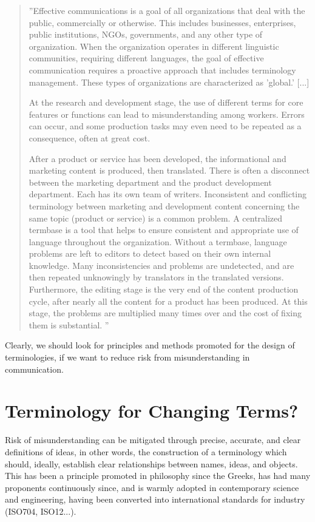 \documentclass[graybox,envcountchap,sectrefs]{svmono}
\begin{document}
\begin{quote}
''Effective communications is a goal of all organizations that deal with the public, commercially or otherwise. This includes businesses, enterprises, public institutions, NGOs, governments, and any other type of organization. When the organization operates in different linguistic communities, requiring different languages, the goal of effective communication requires a proactive approach that includes terminology management. These types of organizations are characterized as 'global.' [...]

At the research and development stage, the use of different terms for core features or functions can lead to misunderstanding among workers. Errors can occur, and some production tasks may even need to be repeated as a consequence, often at great cost. 

After a product or service has been developed, the informational and marketing content is produced, then translated. There is often a disconnect between the marketing department and the product development department. Each has its own team of writers. Inconsistent and conflicting terminology between marketing and development content concerning the same topic (product or service) is a common problem. A centralized termbase is a tool that helps to ensure consistent and appropriate use of language throughout the organization. Without a termbase, language problems are left to editors to detect based on their own internal knowledge. Many inconsistencies and problems are undetected, and are then repeated unknowingly by translators in the translated versions. Furthermore, the editing stage is the very end of the content production cycle, after nearly all the content for a product has been produced. At this stage, the problems are multiplied many times over and the cost of fixing them is substantial.
'' \cite{terminorgs2016}
\end{quote}

Clearly, we should look for principles and methods promoted for the design of terminologies, if we want to reduce risk from misunderstanding in communication.

\section{Terminology for Changing Terms?}

Risk of misunderstanding can be mitigated through precise, accurate, and clear definitions of ideas, in other words, the construction of a terminology which should, ideally, establish clear relationships between names, ideas, and objects. This has been a principle promoted in philosophy since the Greeks, has had many proponents continuously since, and is warmly adopted in contemporary science and engineering, having been converted into international standards for industry (ISO704, ISO12...). 
\end{document}
